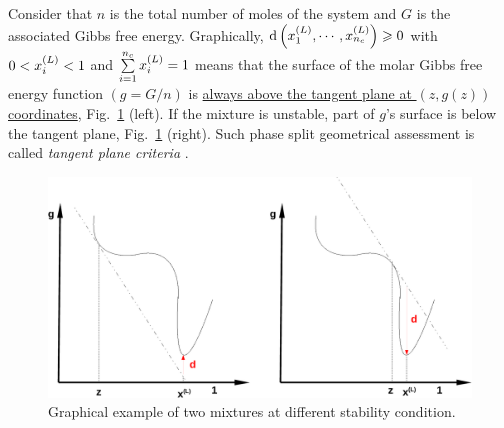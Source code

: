 Consider that $n$ is the total number of moles of the system and $G$ is the associated Gibbs free energy. Graphically, $\d\left(\mfr[x]{1}{L}, \cdots, \mfr[x]{n_{c}}{L}\right) \ge 0$ with $0 < \mfr[x]{i}{L} < 1$ and $\summation_{i=1}^{n_{c}}\mfr[x]{i}{L} = 1$ means that the surface of the molar Gibbs free energy function $\left(g=G/n\right)$ is \underline{always above the tangent plane at $\left(z,g(z)\right)$ coordinates}, Fig.~\ref{Chapter:ThermodynamicFormulation:Fig:PhaseStabilityCriteria} (left). If the mixture is unstable, part of $g$'s surface is below the tangent plane, Fig.~\ref{Chapter:ThermodynamicFormulation:Fig:PhaseStabilityCriteria} (right). Such phase split geometrical assessment is called {\it tangent plane criteria} \citep[see][]{michelsen_1984,baker_1982}.
\begin{figure}[h]
        \begin{center}
          \includegraphics[width=\columnwidth,clip]{./Figs/StabilityCriteria2}\vspace{-0.5cm}
        \end{center}
           \caption{Graphical example of two mixtures at different stability condition.} \label{Chapter:ThermodynamicFormulation:Fig:PhaseStabilityCriteria}
\end{figure}

